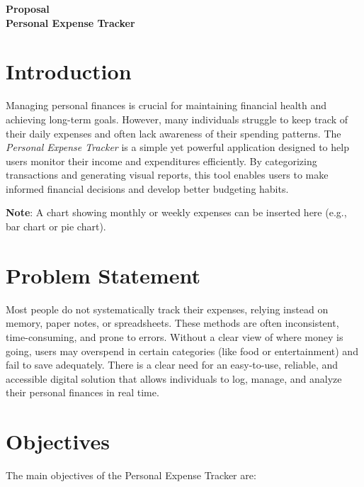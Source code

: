 \documentclass[a4paper,12pt]{article}
\begin{document}
\tableofcontents
\newpage

\begin{center}
    {\LARGE \textbf{Proposal}}\\[1em]
    {\Large \textbf{Personal Expense Tracker}}
\end{center}

\section{Introduction}

Managing personal finances is crucial for maintaining financial health and achieving long-term goals. However, many individuals struggle to keep track of their daily expenses and often lack awareness of their spending patterns. The \textit{Personal Expense Tracker} is a simple yet powerful application designed to help users monitor their income and expenditures efficiently. By categorizing transactions and generating visual reports, this tool enables users to make informed financial decisions and develop better budgeting habits.

\textbf{Note}: A chart showing monthly or weekly expenses can be inserted here (e.g., bar chart or pie chart).

\section{Problem Statement}

Most people do not systematically track their expenses, relying instead on memory, paper notes, or spreadsheets. These methods are often inconsistent, time-consuming, and prone to errors. Without a clear view of where money is going, users may overspend in certain categories (like food or entertainment) and fail to save adequately. There is a clear need for an easy-to-use, reliable, and accessible digital solution that allows individuals to log, manage, and analyze their personal finances in real time.

\section{Objectives}

The main objectives of the Personal Expense Tracker are:
\end{document}
